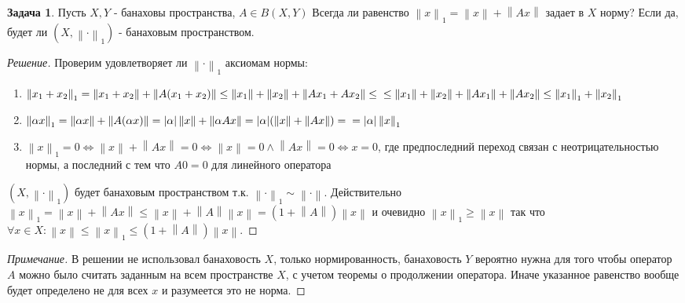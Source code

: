 \documentclass[12pt,a4paper]{article}
\theoremstyle{definition}
\newtheorem{exercise}{Задача}[section]
\newenvironment{solution}
{\renewcommand\qedsymbol{$\blacksquare$}\begin{proof}[Решение]}
{\end{proof}}
\newenvironment{note}
{\renewcommand\qedsymbol{}\begin{proof}[Примечание]}
	{\end{proof}}
\newcommand{\norm}[1]{\left\lVert#1\right\rVert}
\begin{document}
	\begin{exercise}
		Пусть $X,Y$ - банаховы пространства, $A\in B(X,Y)$ Всегда ли равенство $\norm{x}_1 = \norm{x} + \norm{Ax}$ задает в $X$ норму? Если да, будет ли $(X, \norm{\cdot}_1)$ - банаховым пространством.
	\end{exercise}
	\begin{solution}
		Проверим удовлетворяет ли $\norm{\cdot}_1$ аксиомам нормы:
		\begin{enumerate}
			\item $\norm{x_1 + x_2}_1 = \norm{x_1 + x_2} + \norm{A(x_1 + x_2)} \leq \norm{x_1} + \norm{x_2} + \norm{Ax_1 + Ax_2} \leq \newline
			\leq \norm{x_1} + \norm{x_2} + \norm{Ax_1} + \norm{Ax_2}
			\leq \norm{x_1}_1 + \norm{x_2}_1$
			
			\item $\norm{\alpha x}_1 = \norm{\alpha x} + \norm{A(\alpha x)} = |\alpha| \norm{x} + \norm{\alpha Ax} = |\alpha| (\norm{x} + \norm{Ax}) = \newline = |\alpha|\norm{x}_1$
			
			\item $\norm{x}_1 = 0 \Leftrightarrow \norm{x} + \norm{Ax} = 0 \Leftrightarrow \norm{x} = 0 \wedge \norm{Ax} = 0 \Leftrightarrow x = 0$, где предпоследний переход связан с неотрицательностью нормы, а последний с тем что $A0=0$ для линейного оператора
		\end{enumerate}
		$(X, \norm{\cdot}_1)$ будет банаховым пространством т.к. $\norm{\cdot}_1 \sim \norm{\cdot}$. Действительно $\norm{x}_1 = \norm{x} + \norm{Ax} \leq \norm{x} + \norm{A}\norm{x} = (1 + \norm{A})\norm{x}$ и очевидно $\norm{x}_1 \geq \norm{x}$ так что
		$\forall x\in X : \norm{x} \leq \norm{x}_1 \leq (1 + \norm{A})\norm{x}$.
	\end{solution}

	\begin{note}
		В решении не использовал банаховость $X$, только нормированность, банаховость $Y$ вероятно нужна для того чтобы оператор $A$ можно было считать заданным на всем пространстве $X$, с учетом теоремы о продолжении оператора. Иначе указанное равенство вообще будет определено не для всех $x$ и разумеется это не норма.
	\end{note}

	\newpage
	
\end{document}
